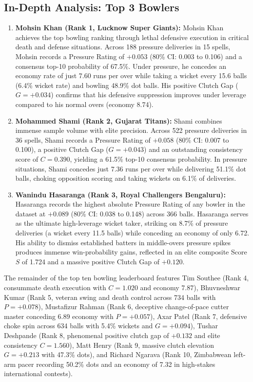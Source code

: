 \documentclass[11pt,a4paper]{article}
\begin{document}
\subsection{In-Depth Analysis: Top 3 Bowlers}
\begin{enumerate}
    \item \textbf{Mohsin Khan (Rank 1, Lucknow Super Giants):} Mohsin Khan achieves the top bowling ranking through lethal defensive execution in critical death and defense situations. Across 188 pressure deliveries in 15 spells, Mohsin records a Pressure Rating of $+0.053$ (80\% CI: 0.003 to 0.106) and a consensus top-10 probability of 67.5\%. Under pressure, he concedes an economy rate of just 7.60 runs per over while taking a wicket every 15.6 balls (6.4\% wicket rate) and bowling 48.9\% dot balls. His positive Clutch Gap ($G = +0.034$) confirms that his defensive suppression improves under leverage compared to his normal overs (economy 8.74).
    \item \textbf{Mohammed Shami (Rank 2, Gujarat Titans):} Shami combines immense sample volume with elite precision. Across 522 pressure deliveries in 36 spells, Shami records a Pressure Rating of $+0.058$ (80\% CI: 0.007 to 0.100), a positive Clutch Gap ($G = +0.043$) and an outstanding consistency score of $C = 0.390$, yielding a 61.5\% top-10 consensus probability. In pressure situations, Shami concedes just 7.36 runs per over while delivering 51.1\% dot balls, choking opposition scoring and taking wickets on 6.1\% of deliveries.
    \item \textbf{Wanindu Hasaranga (Rank 3, Royal Challengers Bengaluru):} Hasaranga records the highest absolute Pressure Rating of any bowler in the dataset at $+0.089$ (80\% CI: 0.038 to 0.148) across 366 balls. Hasaranga serves as the ultimate high-leverage wicket taker, striking on 8.7\% of pressure deliveries (a wicket every 11.5 balls) while conceding an economy of only 6.72. His ability to dismiss established batters in middle-overs pressure spikes produces immense win-probability gains, reflected in an elite composite Score $S$ of 1.724 and a massive positive Clutch Gap of $+0.120$.
\end{enumerate}

The remainder of the top ten bowling leaderboard features Tim Southee (Rank 4, consummate death execution with $C = 1.020$ and economy 7.87), Bhuvneshwar Kumar (Rank 5, veteran swing and death control across 734 balls with $P = +0.078$), Mustafizur Rahman (Rank 6, deceptive change-of-pace cutter master conceding 6.89 economy with $P = +0.057$), Axar Patel (Rank 7, defensive choke spin across 634 balls with 5.4\% wickets and $G = +0.094$), Tushar Deshpande (Rank 8, phenomenal positive clutch gap of $+0.132$ and elite consistency $C = 1.560$), Matt Henry (Rank 9, massive clutch elevation $G = +0.213$ with 47.3\% dots), and Richard Ngarava (Rank 10, Zimbabwean left-arm pacer recording 50.2\% dots and an economy of 7.32 in high-stakes international contests).
\end{document}
